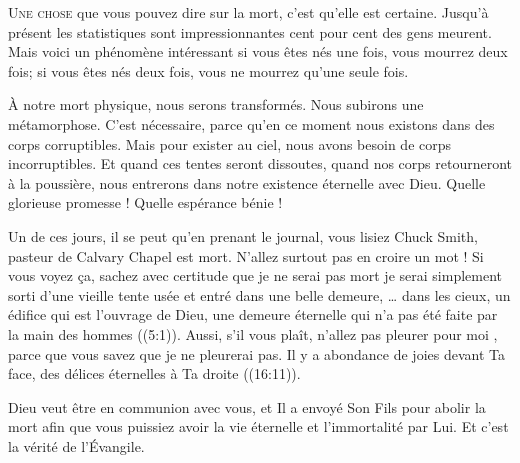 


\lettrine{U}{ne chose} que vous pouvez dire sur la mort,
 c'est qu'elle est certaine.
 Jusqu'à présent les statistiques sont impressionnantes\frcolon{}
 cent pour cent des gens meurent. Mais voici un phénomène intéressant\frcolon{}
 si vous êtes nés une fois, vous mourrez deux fois;
 si vous êtes nés deux fois, vous ne mourrez qu'une seule fois.

À notre mort physique, nous serons transformés.
 Nous subirons une métamorphose. C'est nécessaire, parce qu'en ce moment
 nous existons dans des corps corruptibles. Mais pour exister au ciel,
 nous avons besoin de corps incorruptibles. Et quand ces tentes
 seront dissoutes, quand nos corps retourneront à la poussière,
 nous entrerons dans notre existence éternelle avec Dieu.
 Quelle glorieuse promesse ! Quelle espérance bénie ! 


Un de ces jours, il se peut qu'en prenant le journal,
 vous lisiez\frcolon{} 
 \Og Chuck Smith, pasteur de Calvary Chapel est mort. \Fg{}
 N'allez surtout pas en croire un mot ! Si vous voyez \c{c}a,
 sachez avec certitude que je ne serai pas mort \ocadr je serai simplement
 sorti d'une vieille tente usée et entré dans une belle demeure,
 \Og \dots{} 
 dans les cieux, un édifice qui est l'ouvrage de Dieu, une demeure éternelle
 qui n'a pas été faite par la main des hommes \Fg{} ((5:1)).
 Aussi, s'il vous plaît, n'allez pas pleurer pour moi
 , parce que vous savez que je ne pleurerai pas.
 \Og Il y a abondance de joies devant Ta face, des délices éternelles
 à Ta droite \Fg{} ((16:11)). 

Dieu veut être en communion avec vous, et Il a envoyé Son Fils pour abolir
 la mort afin que vous puissiez avoir la vie éternelle
 et l'immortalité par Lui. Et c'est la vérité de l'Évangile.

\dvrule




